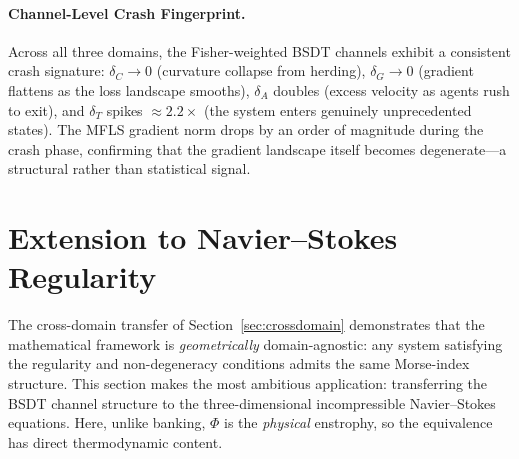 \documentclass[final]{siamltex}
\begin{document}
\paragraph{Channel-Level Crash Fingerprint.}
Across all three domains, the Fisher-weighted BSDT channels exhibit
a consistent crash signature: $\delta_C \to 0$ (curvature collapse
from herding), $\delta_G \to 0$ (gradient flattens as the loss
landscape smooths), $\delta_A$ doubles (excess velocity as agents
rush to exit), and $\delta_T$ spikes $\approx 2.2\times$ (the
system enters genuinely unprecedented states).  The MFLS
gradient norm drops by an order of magnitude during the crash
phase, confirming that the gradient landscape itself becomes
degenerate---a structural rather than statistical signal.


\section{Extension to Navier--Stokes Regularity}\label{sec:ns}

The cross-domain transfer of Section~\ref{sec:crossdomain}
demonstrates that the mathematical framework is
\emph{geometrically} domain-agnostic: any system satisfying
the regularity and non-degeneracy conditions admits the same
Morse-index structure.
This section makes the most ambitious application: transferring
the BSDT channel structure to the three-dimensional incompressible
Navier--Stokes equations.  Here, unlike banking, $\Phi$ is the
\emph{physical} enstrophy, so the equivalence has direct
thermodynamic content.
\end{document}
